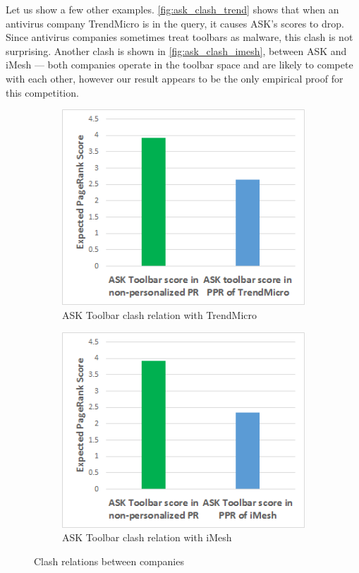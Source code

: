 \documentclass[ijoc,nonblindrev]{informs3} %
\numberwithin{equation}{subsection}
\begin{document}
Let us show a few other examples. \autoref{fig:ask_clash_trend} shows that when an antivirus company TrendMicro is in the query, it causes ASK's scores to drop. Since antivirus companies sometimes treat toolbars as malware, this clash is not surprising. Another clash is shown in \autoref{fig:ask_clash_imesh}, between ASK and iMesh --- both companies operate in the toolbar space and are likely to compete with each other, however our result appears to be the only empirical proof for this competition.


\begin{figure}[!htbp]
\centering
\begin{subfigure}[b]{0.49\textwidth}
	\centering
\includegraphics[width=\textwidth]{figures/ask_clash_trend.png}
\caption{ASK Toolbar clash relation with TrendMicro}
\label{fig:ask_clash_trend}
\end{subfigure}
\begin{subfigure}[b]{0.49\textwidth}
	\centering
\includegraphics[width=\textwidth]{figures/ask_clash_imesh.png}
\caption{ASK Toolbar clash relation with iMesh}
\label{fig:ask_clash_imesh}
\end{subfigure}
\caption{Clash relations between companies}
	\label{fig:clash_1}
\end{figure}
\end{document}
